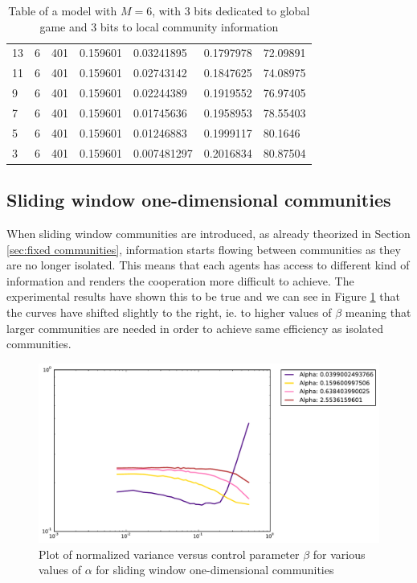 \begin{table}
{\begin{tabular}{lllllll}
    13 &  6 &  401 &  0.159601 &   0.03241895 &   0.1797978 &  72.09891 \\
    11 &  6 &  401 &  0.159601 &   0.02743142 &   0.1847625 &  74.08975 \\
     9 &  6 &  401 &  0.159601 &   0.02244389 &   0.1919552 &  76.97405 \\
     7 &  6 &  401 &  0.159601 &   0.01745636 &   0.1958953 &  78.55403 \\
     5 &  6 &  401 &  0.159601 &   0.01246883 &   0.1999117 &   80.1646 \\
     3 &  6 &  401 &  0.159601 &  0.007481297 &   0.2016834 &  80.87504 \\
\bottomrule
\end{tabular}%
}
\caption{Table of a model with $M=6$, with 3 bits dedicated to global game and 3 bits to local community information}
\label{table:fixed m6}
\end{table}

\subsection{Sliding window one-dimensional communities}

When sliding window communities are introduced, as already theorized in Section \ref{sec:fixed communities}, information starts flowing between communities as they are no longer isolated.
This means that each agents has access to different kind of information and renders the cooperation more difficult to achieve.
The experimental results have shown this to be true and we can see in Figure \ref{fig:sliding vicinity partial} that the curves have shifted slightly to the right, ie. to higher values of $\beta$ meaning that larger communities are needed in order to achieve same efficiency as isolated communities.

\begin{figure}[h]
\begin{center}
\includegraphics[scale=0.4]{images/results/vicinity_sliding_n401_rounds10000_partial.pdf}
\caption{Plot of normalized variance versus control parameter $\beta$ for various values of $\alpha$  for sliding window one-dimensional communities}
\label{fig:sliding vicinity partial}
\end{center}
\end{figure}

